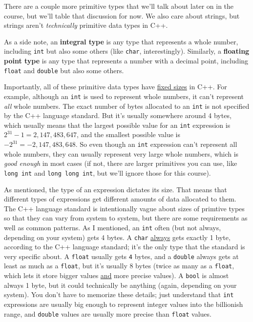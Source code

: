 \documentclass{article}
\begin{document}
There are a couple more primitive types that we'll talk about later on in the course, but we'll table that discussion for now. We also care about strings, but strings aren't \textit{technically} primitive data types in C++.

As a side note, an \textbf{integral type} is any type that represents a whole number, including \texttt{int} but also some others (like \texttt{char}, interestingly). Similarly, a \textbf{floating point type} is any type that represents a number with a decimal point, including \texttt{float} and \texttt{double} but also some others.

Importantly, all of these primitive data types have \ul{fixed sizes} in C++. For example, although an \texttt{int} is used to represent whole numbers, it can't represent \textit{all} whole numbers. The exact number of bytes allocated to an \texttt{int} is not specified by the C++ language standard. But it's usually somewhere around 4 bytes, which usually means that the largest possible value for an \texttt{int} expression is $2^{31} - 1 = 2{,}147{,}483{,}647$, and the smallest possible value is $-2^{31} = -2{,}147{,}483{,}648$. So even though an \texttt{int} expression can't represent all whole numbers, they can usually represent very large whole numbers, which is \textit{good enough} in most cases (if not, there are larger primitives you can use, like \texttt{long int} and \texttt{long long int}, but we'll ignore those for this course).

As mentioned, the type of an expression dictates its size. That means that different types of expressions get different amounts of data allocated to them. The C++ language standard is intentionally vague about sizes of primtive types so that they can vary from system to system, but there are some requirements as well as common patterns. As I mentioned, an \texttt{int} often (but not always, depending on your system) gets 4 bytes. A \texttt{char} \ul{always} gets exactly 1 byte, according to the C++ language standard; it's the only type that the standard is very specific about. A \texttt{float} usually gets \texttt{4} bytes, and a \texttt{double} always gets at least as much as a \texttt{float}, but it's usually 8 bytes (twice as many as a \texttt{float}, which lets it store bigger values \ul{and} more precise values). A \texttt{bool} is almost always 1 byte, but it could technically be anything (again, depending on your system). You don't have to memorize these details; just understand that \texttt{int} expressions are usually big enough to represent integer values into the billionish range, and \texttt{double} values are usually more precise than \texttt{float} values.
\end{document}
